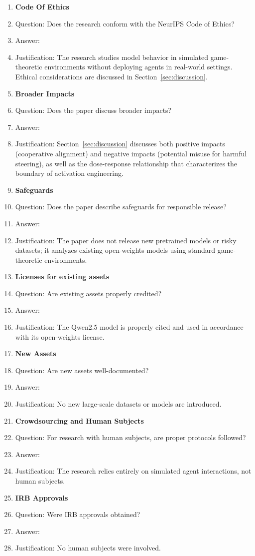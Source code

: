 \documentclass{article}
\begin{document}
\begin{enumerate}
\item {\bf Code Of Ethics}
    \item[] Question: Does the research conform with the NeurIPS Code of Ethics?
    \item[] Answer: \answerYes{}
    \item[] Justification: The research studies model behavior in simulated game-theoretic environments without deploying agents in real-world settings. Ethical considerations are discussed in Section~\ref{sec:discussion}.

\item {\bf Broader Impacts}
    \item[] Question: Does the paper discuss broader impacts?
    \item[] Answer: \answerYes{}
    \item[] Justification: Section~\ref{sec:discussion} discusses both positive impacts (cooperative alignment) and negative impacts (potential misuse for harmful steering), as well as the dose-response relationship that characterizes the boundary of activation engineering.

\item {\bf Safeguards}
    \item[] Question: Does the paper describe safeguards for responsible release?
    \item[] Answer: \answerNA{}
    \item[] Justification: The paper does not release new pretrained models or risky datasets; it analyzes existing open-weights models using standard game-theoretic environments.

\item {\bf Licenses for existing assets}
    \item[] Question: Are existing assets properly credited?
    \item[] Answer: \answerYes{}
    \item[] Justification: The Qwen2.5 model is properly cited and used in accordance with its open-weights license.

\item {\bf New Assets}
    \item[] Question: Are new assets well-documented?
    \item[] Answer: \answerNA{}
    \item[] Justification: No new large-scale datasets or models are introduced.

\item {\bf Crowdsourcing and Human Subjects}
    \item[] Question: For research with human subjects, are proper protocols followed?
    \item[] Answer: \answerNA{}
    \item[] Justification: The research relies entirely on simulated agent interactions, not human subjects.

\item {\bf IRB Approvals}
    \item[] Question: Were IRB approvals obtained?
    \item[] Answer: \answerNA{}
    \item[] Justification: No human subjects were involved.

\end{enumerate}
\end{document}
